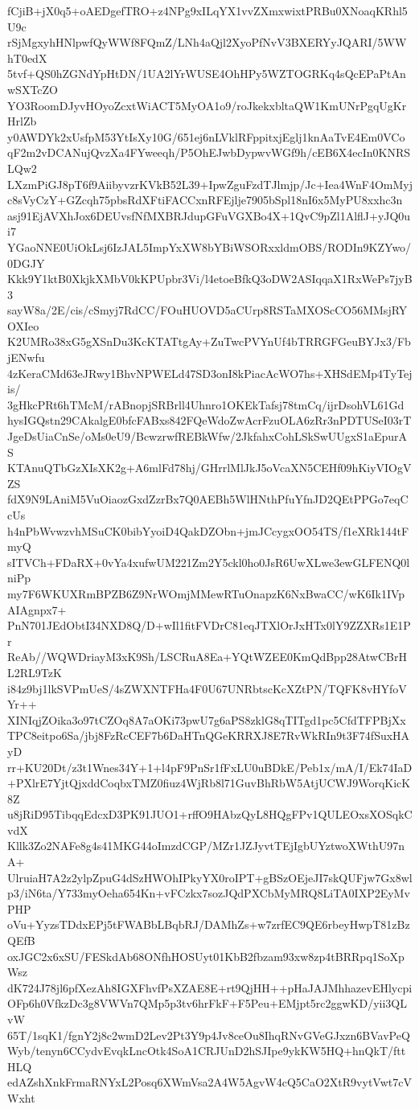 fCjiB+jX0q5+oAEDgefTRO+z4NPg9xILqYX1vvZXmxwixtPRBu0XNoaqKRhl5U9c
rSjMgxyhHNlpwfQyWWf8FQmZ/LNh4aQjl2XyoPfNvV3BXERYyJQARI/5WWhT0edX
5tvf+QS0hZGNdYpHtDN/1UA2lYrWUSE4OhHPy5WZTOGRKq4sQcEPaPtAnwSXTcZO
YO3RoomDJyvHOyoZcxtWiACT5MyOA1o9/roJkekxbltaQW1KmUNrPgqUgKrHrlZb
y0AWDYk2xUsfpM53YtIsXy10G/651ej6nLVklRFppitxjEglj1knAaTvE4Em0VCo
qF2m2vDCANujQvzXa4FYweeqh/P5OhEJwbDypwvWGf9h/cEB6X4ecIn0KNRSLQw2
LXzmPiGJ8pT6f9AiibyvzrKVkB52L39+IpwZguFzdTJlmjp/Jc+Iea4WnF4OmMyj
c8sVyCzY+GZcqh75pbsRdXFtiFACCxnRFEjlje7905bSpl18nI6x5MyPU8xxhc3n
asj91EjAVXhJox6DEUvsfNfMXBRJdupGFuVGXBo4X+1QvC9pZl1AlflJ+yJQ0ui7
YGaoNNE0UiOkLsj6IzJAL5ImpYxXW8bYBiWSORxxldmOBS/RODIn9KZYwo/0DGJY
Kkk9Y1ktB0XkjkXMbV0kKPUpbr3Vi/l4etoeBfkQ3oDW2ASIqqaX1RxWePs7jyB3
sayW8a/2E/cis/cSmyj7RdCC/FOuHUOVD5aCUrp8RSTaMXOScCO56MMsjRYOXIeo
K2UMRo38xG5gXSnDu3KcKTATtgAy+ZuTwcPVYnUf4bTRRGFGeuBYJx3/FbjENwfu
4zKeraCMd63eJRwy1BhvNPWELd47SD3onI8kPiacAcWO7hs+XHSdEMp4TyTejis/
3gHkcPRt6hTMcM/rABnopjSRBrll4Uhnro1OKEkTafsj78tmCq/ijrDsohVL61Gd
hysIGQstn29CAkalgE0bfcFABxs842FQeWdoZwAcrFzuOLA6zRr3nPDTUSeI03rT
JgeDsUiaCnSe/oMs0eU9/BcwzrwfREBkWfw/2JkfahxCohLSkSwUUgxS1aEpurAS
KTAnuQTbGzXIsXK2g+A6mlFd78hj/GHrrlMlJkJ5oVcaXN5CEHf09hKiyVIOgVZS
fdX9N9LAniM5VuOiaozGxdZzrBx7Q0AEBh5WlHNthPfuYfnJD2QEtPPGo7eqCcUs
h4nPbWvwzvhMSuCK0bibYyoiD4QakDZObn+jmJCcygxOO54TS/f1eXRk144tFmyQ
sITVCh+FDaRX+0vYa4xufwUM221Zm2Y5ckl0ho0JsR6UwXLwe3ewGLFENQ0lniPp
my7F6WKUXRmBPZB6Z9NrWOmjMMewRTuOnapzK6NxBwaCC/wK6Ik1IVpAIAgnpx7+
PnN701JEdObtI34NXD8Q/D+wIl1fitFVDrC81eqJTXlOrJxHTx0lY9ZZXRs1E1Pr
ReAb//WQWDriayM3xK9Sh/LSCRuA8Ea+YQtWZEE0KmQdBpp28AtwCBrHL2RL9TzK
i84z9bj1lkSVPmUeS/4sZWXNTFHa4F0U67UNRbtscKcXZtPN/TQFK8vHYfoVYr++
XINIqjZOika3o97tCZOq8A7aOKi73pwU7g6aPS8zklG8qTITgd1pc5CfdTFPBjXx
TPC8eitpo6Sa/jbj8FzRcCEF7b6DaHTnQGeKRRXJ8E7RvWkRIn9t3F74fSuxHAyD
rr+KU20Dt/z3t1Wnes34Y+1+l4pF9PnSr1fFxLU0uBDkE/Peb1x/mA/I/Ek74IaD
+PXlrE7YjtQjxddCoqbxTMZ0fiuz4WjRb8l71GuvBhRbW5AtjUCWJ9WorqKicK8Z
u8jRiD95TibqqEdcxD3PK91JUO1+rffO9HAbzQyL8HQgFPv1QULEOxsXOSqkCvdX
Kllk3Zo2NAFe8g4s41MKG44oImzdCGP/MZr1JZJyvtTEjIgbUYztwoXWthU97nA+
UlruiaH7A2z2ylpZpuG4dSzHWOhIPkyYX0roIPT+gBSzOEjeJI7skQUFjw7Gx8wl
p3/iN6ta/Y733myOeha654Kn+vFCzkx7sozJQdPXCbMyMRQ8LiTA0IXP2EyMvPHP
oVu+YyzsTDdxEPj5tFWABbLBqbRJ/DAMhZs+w7zrfEC9QE6rbeyHwpT81zBzQEfB
oxJGC2x6xSU/FESkdAb68ONfhHOSUyt01KbB2fbzam93xw8zp4tBRRpq1SoXpWsz
dK724J78jl6pfXezAh8IGXFhvfPsXZAE8E+rt9QjHH++pHaJAJMhhazevEHlycpi
OFp6h0VfkzDc3g8VWVn7QMp5p3tv6hrFkF+F5Peu+EMjpt5rc2ggwKD/yii3QLvW
65T/1sqK1/fgnY2j8c2wmD2Lev2Pt3Y9p4Jv8ceOu8IhqRNvGVeGJxzn6BVavPeQ
Wyb/tenyn6CCydvEvqkLncOtk4SoA1CRJUnD2hSJIpe9ykKW5HQ+hnQkT/fttHLQ
edAZshXnkFrmaRNYxL2Posq6XWmVsa2A4W5AgvW4cQ5CaO2XtR9vytVwt7cVWxht
